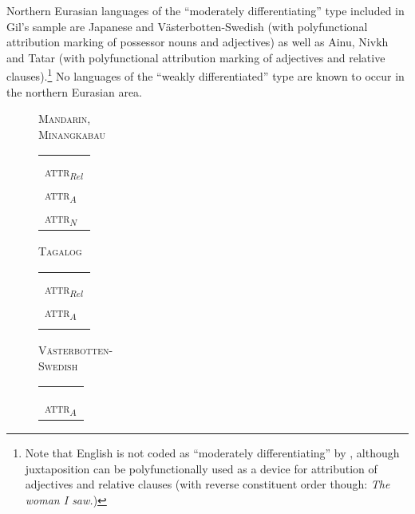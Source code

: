 Northern Eurasian languages of the “moderately differentiating” type included in Gil's sample are Japanese and Västerbotten-Swedish (with polyfunctional attribution marking of possessor nouns and adjectives) as well as Ainu, Nivkh and Tatar (with polyfunctional attribution marking of adjectives and relative clauses).\footnote{Note that English is not coded as “moderately differentiating” by \citet{gil2005}, although juxtaposition can be polyfunctionally used as a device for attribution of adjectives and relative clauses (with reverse constituent order though: \textit{The woman I saw.})} No languages of the “weakly differentiated” type are known to occur in the northern Eurasian area. 
\begin{figure} \label{multi abcd}
\parbox[b]{0.20\textwidth}{
\begin{center}\textsc{Mandarin},\\\textsc{Minangkabau}\\
\medskip
\begin{tabular}{| l |}
\hline
\\
\hline
\hline
\\
\hline
\textsc{attr}$_{Rel}$\\
\hline
\textsc{attr}$_{A}$\\
\hline
\textsc{attr}$_{N}$\\
\hline
\end{tabular}
\end{center}
}
\parbox[b]{0.20\textwidth}{
\begin{center}\textsc{Tagalog}\\
\bigskip
\begin{tabular}{| l |}
\hline
\\
\hline
\hline
\\
\hline
\textsc{attr}$_{Rel}$\\
\hline
\textsc{attr}$_{A}$\\
\hline
\\
\hline
\end{tabular}
\end{center}
}
\parbox[b]{0.20\textwidth}{
\begin{center}\textsc{Västerbotten-}\\\textsc{Swedish}\\
\medskip
\begin{tabular}{| l |}
\hline
\\
\hline
\hline
\\
\hline
\\
\hline
\textsc{attr}$_{A}$\\

\end{tabular}
\end{center}}
\end{figure}
